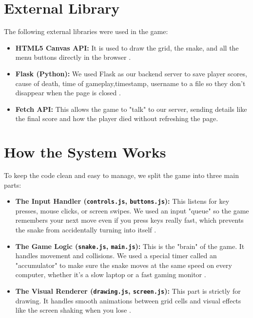 \section{External Library}
The following external libraries were used in the game: 
\begin{itemize}
    \item \textbf{HTML5 Canvas API:} It is used to draw the grid, the snake, and all the menu buttons directly in the browser .
    \item \textbf{Flask (Python):} We used Flask as our backend server to save player scores, cause of death, time of gameplay,timestamp, username to a file so they don't disappear when the page is closed .
    \item \textbf{Fetch API:} This allows the game to "talk" to our server, sending details like the final score and how the player died without refreshing the page.  
\end{itemize}

\section{How the System Works}
To keep the code clean and easy to manage, we split the game into three main parts:
\begin{itemize}
    \item \textbf{The Input Handler (\texttt{controls.js}, \texttt{buttons.js}):} This listens for key presses, mouse clicks, or screen swipes. We used an input "queue" so the game remembers your next move even if you press keys really fast, which prevents the snake from accidentally turning into itself .
    \item \textbf{The Game Logic (\texttt{snake.js}, \texttt{main.js}):} This is the "brain" of the game. It handles movement and collisions. We used a special timer called an "accumulator" to make sure the snake moves at the same speed on every computer, whether it's a slow laptop or a fast gaming monitor .
    \item \textbf{The Visual Renderer (\texttt{drawing.js}, \texttt{screen.js}):} This part is strictly for drawing. It handles smooth animations between grid cells and visual effects like the screen shaking when you lose .
\end{itemize}

